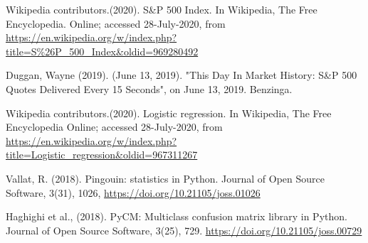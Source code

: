 \documentclass[12pt]{article}
\begin{document}
\begin{thebibliography}{999}

	Wikipedia contributors.(2020). S\&P 500 Index. In Wikipedia, The Free Encyclopedia. Online; accessed 28-July-2020, from {\url{https://en.wikipedia.org/w/index.php?title=S\%26P_500_Index&oldid=969280492}}
	
	Duggan, Wayne (2019). (June 13, 2019). "This Day In Market History: S\&P 500 Quotes Delivered Every 15 Seconds", on June 13, 2019. Benzinga.
	
	Wikipedia contributors.(2020). Logistic regression. In Wikipedia, The Free Encyclopedia Online; accessed 28-July-2020, from  {\url{https://en.wikipedia.org/w/index.php?title=Logistic\_regression\&oldid=967311267}}
	
	Vallat, R. (2018). Pingouin: statistics in Python. Journal of Open Source Software, 3(31), 1026, {\url{https://doi.org/10.21105/joss.01026}}
	
	Haghighi et al., (2018). PyCM: Multiclass confusion matrix library in Python. Journal of Open Source Software, 3(25), 729.
	{\url{https://doi.org/10.21105/joss.00729}}
\end{thebibliography}
\end{document}
